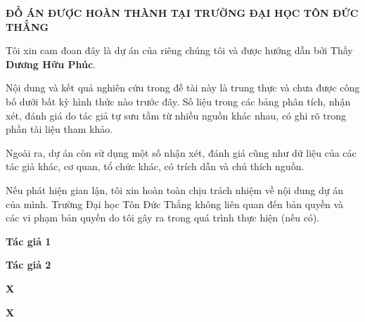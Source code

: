 \begin{center}
    \textbf{\large ĐỒ ÁN ĐƯỢC HOÀN THÀNH
TẠI TRƯỜNG ĐẠI HỌC TÔN ĐỨC THẮNG}\\[1cm]
\end{center}

\textmd{\large Tôi xin cam đoan đây là dự án của riêng chúng tôi và được hướng dẫn bởi Thầy \textbf{Dương Hữu Phúc}.}

\textmd{\large Nội dung và kết quả nghiên cứu trong đề tài này là trung thực và chưa được công bố dưới bất kỳ hình thức nào trước đây. Số liệu trong các bảng phân tích, nhận xét, đánh giá do tác giả tự sưu tầm từ nhiều nguồn khác nhau, có ghi rõ trong phần tài liệu tham khảo.}

\textmd{\large Ngoài ra, dự án còn sử dụng một số nhận xét, đánh giá cũng như dữ liệu của các tác giả khác, cơ quan, tổ chức khác, có trích dẫn và chú thích nguồn.}

\textmd{\large Nếu phát hiện gian lận, tôi xin hoàn toàn chịu trách nhiệm về nội dung dự án của mình. Trường Đại học Tôn Đức Thắng không liên quan đến bản quyền và các vi phạm bản quyền do tôi gây ra trong quá trình thực hiện (nếu có).}

\vspace{3cm}

\begin{minipage}[t]{0.45\textwidth}
	\begin{flushleft} \large
		\begin{flushright}
		    \textbf{\large Tác giả 1}
		\end{flushright}
	\end{flushleft}
\end{minipage}
\begin{minipage}[t]{0.45\textwidth}
    \begin{flushright} \large
		\begin{flushright}
		    \textbf{\large Tác giả 2}
		\end{flushright}
	\end{flushright}
\end{minipage}

\vspace{2cm}

\begin{minipage}[t]{0.45\textwidth}
	\begin{flushleft} \large
		\begin{flushright}
		    \textbf{\large X}
		\end{flushright}
	\end{flushleft}
\end{minipage}
\begin{minipage}[t]{0.45\textwidth}
    \begin{flushright} \large
		\begin{flushright}
		    \textbf{\large X}
		\end{flushright}
	\end{flushright}
\end{minipage}

